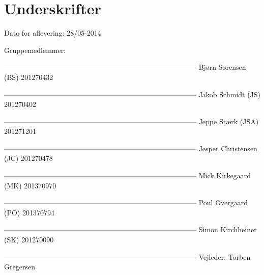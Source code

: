 \chapter*{Underskrifter}

Dato for aflevering: 28/05-2014

Gruppemedlemmer:\newline


--------------------------------------------------------------------------------- \newline
Bjørn Sørensen (BS) 201270432\newline


---------------------------------------------------------------------------------\newline
Jakob Schmidt (JS) 201270402\newline


---------------------------------------------------------------------------------\newline
Jeppe Stærk (JSA) 201271201\newline


---------------------------------------------------------------------------------\newline
Jesper Christensen (JC) 201270478\newline


---------------------------------------------------------------------------------\newline
Mick Kirkegaard (MK) 201370970\newline


---------------------------------------------------------------------------------\newline
Poul Overgaard (PO) 201370794\newline


---------------------------------------------------------------------------------\newline
Simon Kirchheiner (SK) 201270090\newline









---------------------------------------------------------------------------------\newline
Vejleder: Torben Gregersen\newline
